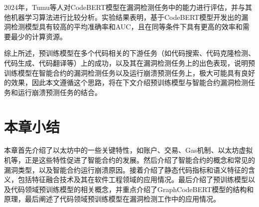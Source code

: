 2024年，Tumu等人\cite{tumu}对CodeBERT模型\cite{codebert}在漏洞检测任务中的能力进行评估，并与其他机器学习算法进行比较分析。实验结果表明，基于CodeBERT模型开发出的漏洞检测模型具有较高的平均准确率和AUC，且在同等条件下具有更高的效率和需要最少的计算资源。

综上所述，预训练模型在多个代码相关的下游任务（如代码搜索、代码克隆检测、代码生成、代码翻译等）上的成功，以及其在漏洞检测任务上的出色表现，说明预训练模型在智能合约的漏洞检测任务以及运行崩溃预测任务上，极大可能具有良好的效果，因此本文遵循这个思路，将在下文介绍预训练模型与智能合约漏洞检测任务和运行崩溃预测任务的结合。
\section{本章小结}
\label{sec:本章小结2}
本章首先介绍了以太坊中的一些关键特性，如账户、交易、Gas机制、以太坊虚拟机等，正是这些特性促进了智能合约的发展。然后介绍了智能合约的概念和常见的漏洞类型，以及智能合约运行崩溃原因。接着介绍了静态代码指标和语义特征的含义，包括特征融合技术及其在软件工程领域的应用情况。最后介绍了预训练模型以及代码领域预训练模型的相关概念，并重点介绍了GraphCodeBERT模型的结构和原理，最后阐述了代码领域预训练模型在漏洞检测工作中的应用情况。
